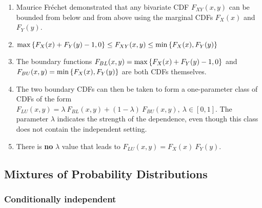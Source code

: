 \begin{enumerate}
    \item Maurice Fréchet demonstrated that any bivariate CDF $F _{X Y} (x, y)$ can be bounded from below and from above using the marginal CDFs $F_X (x)$ and $F_Y (y)$.
    \hfill \cite{statistics/book/Statistics-for-Data-Scientists/Maurits-Kaptein}

    \item
    $
        \max\left\{F_X (x) + F_Y (y) - 1, 0\right\}
        \leq
        F _{X Y} (x, y)
        \leq
        \min\left\{F_X (x), F_Y (y)\right\}
    $
    \hfill \cite{statistics/book/Statistics-for-Data-Scientists/Maurits-Kaptein}

    \item The boundary functions $F_{B L} (x, y) = \max\left\{F_X (x) + F_Y (y) - 1, 0\right\}$ and $F_{ BU} (x, y) = \min\left\{F_X (x), F_Y (y)\right\}$ are both CDFs themselves.
    \hfill \cite{statistics/book/Statistics-for-Data-Scientists/Maurits-Kaptein}

    \item The two boundary CDFs can then be taken to form a one-parameter class of CDFs of the form $F_{LU} (x, y) = \lambda\ F_{B L} (x, y) + (1 - \lambda)\ F_{BU} (x, y),\ \lambda \in [0, 1]$.
    The parameter $\lambda$ indicates the strength of the dependence, even though this class does not contain the independent setting.
    \hfill \cite{statistics/book/Statistics-for-Data-Scientists/Maurits-Kaptein}

    \item There is \textbf{no} $\lambda$ value that leads to $F_{LU} (x, y) = F_X (x)\ F_Y (y)$.
    \hfill \cite{statistics/book/Statistics-for-Data-Scientists/Maurits-Kaptein}
\end{enumerate}



\subsection{Mixtures of Probability Distributions}

\subsubsection{Conditionally independent}

